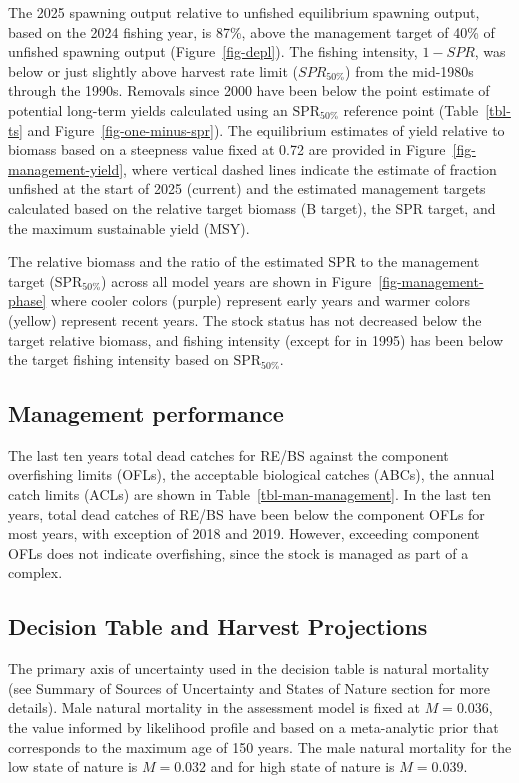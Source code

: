 \documentclass[
]{article}
\begin{document}
The 2025 spawning output relative to unfished equilibrium spawning
output, based on the 2024 fishing year, is 87\%, above the management
target of 40\% of unfished spawning output (Figure~\ref{fig-depl}). The
fishing intensity, \(1-SPR\), was below or just slightly above harvest
rate limit (\(SPR_{50\%}\)) from the mid-1980s through the 1990s.
Removals since 2000 have been below the point estimate of potential
long-term yields calculated using an \(\text{SPR}_{50\%}\) reference
point (Table~\ref{tbl-ts} and Figure~\ref{fig-one-minus-spr}). The
equilibrium estimates of yield relative to biomass based on a steepness
value fixed at 0.72 are provided in Figure~\ref{fig-management-yield},
where vertical dashed lines indicate the estimate of fraction unfished
at the start of 2025 (current) and the estimated management targets
calculated based on the relative target biomass (B target), the SPR
target, and the maximum sustainable yield (MSY).

The relative biomass and the ratio of the estimated SPR to the
management target (\(\text{SPR}_{50\%}\)) across all model years are
shown in Figure~\ref{fig-management-phase} where cooler colors (purple)
represent early years and warmer colors (yellow) represent recent years.
The stock status has not decreased below the target relative biomass,
and fishing intensity (except for in 1995) has been below the target
fishing intensity based on \(\text{SPR}_{50\%}\).

\subsection{Management performance}\label{management-performance-1}

The last ten years total dead catches for RE/BS against the component
overfishing limits (OFLs), the acceptable biological catches (ABCs), the
annual catch limits (ACLs) are shown in Table~\ref{tbl-man-management}.
In the last ten years, total dead catches of RE/BS have been below the
component OFLs for most years, with exception of 2018 and 2019. However,
exceeding component OFLs does not indicate overfishing, since the stock
is managed as part of a complex.

\subsection{Decision Table and Harvest
Projections}\label{decision-table-and-harvest-projections-1}

The primary axis of uncertainty used in the decision table is natural
mortality (see Summary of Sources of Uncertainty and States of Nature
section for more details). Male natural mortality in the assessment
model is fixed at \(M = 0.036\), the value informed by likelihood
profile and based on a meta-analytic prior that corresponds to the
maximum age of 150 years. The male natural mortality for the low state
of nature is \(M = 0.032\) and for high state of nature is
\(M = 0.039\).
\end{document}
